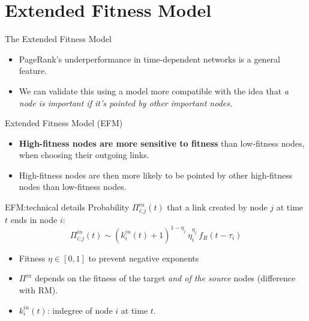 \documentclass[utf8]{beamer}
\begin{document}

\section{Extended Fitness Model}
\begin{frame}{The Extended Fitness Model}
    \begin{itemize}
        \item PageRank's underperformance in time-dependent networks is a general feature.
        \item We can validate this using a model more compatible with the idea that \emph{a node is important if it's pointed by other important nodes.}
    \end{itemize}
    \begin{center}
        \alert{Extended Fitness Model} (EFM)
    \end{center}
    \begin{itemize}
        \item \textbf{High-fitness nodes are more sensitive to fitness} than low-fitness nodes, when choosing their outgoing links.
        \item High-fitness nodes are then more likely to be pointed by other high-fitness nodes than low-fitness nodes.
    \end{itemize}
\end{frame}

\begin{frame}{EFM:\@ technical details}
    Probability $\Pi_{i;j}^{in}(t)$ that a link created by node $j$ at time $t$ ends in node $i$:
    \[
        \Pi_{i;j}^{in}(t) \sim (k_i^{in}(t)+1)^{1-\eta_j} \, \eta_i^{\eta_j} \, f_R(t-\tau_i)
    \]
    \begin{itemize}
        \item Fitness $\eta \in [0, 1]$ to prevent negative exponents
        \item $\Pi^{in}$ depends on the fitness of the target \emph{and of the source} nodes (difference with RM).
        \item $k_i^{in}(t)$: indegree of node $i$ at time $t$.
    \end{itemize}
\end{frame}
\end{document}
